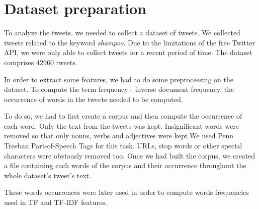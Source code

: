 \section{Dataset preparation}

To analyze the tweets, we needed to collect a dataset of tweets.
We collected tweets related to the keyword \textit{shampoo}. Due to the
limitations of the free Twitter API, we were only able to collect tweets for a
recent period of time. The dataset comprises $42960$ tweets.

In order to extract some features, we had to do some preprocessing on the
dataset. To compute the term frequency - inverse document frequency, the
occurrence of words in the tweets needed to be computed.

To do so, we had to first create a corpus and then compute the occurrence of
each word. Only the text from the tweets was kept. Insignificant words were 
removed so that only nouns, verbs and adjectives were kept.We used Penn Treeban 
Part-of-Speech Tags for this task.  URLs, stop words or other special 
characters were obviously removed too. Once we had built the corpus, we created 
a file containing each words of the corpus and their occurrence throughout the 
whole dataset's tweet's text.

These words occurrences were later used in order to compute words frequencies 
used in TF and TF-IDF features.

